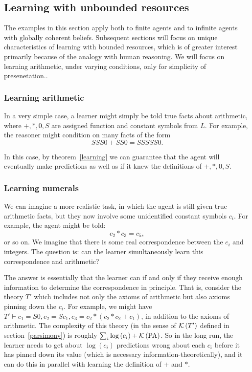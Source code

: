 \documentclass[12pt]{article}
\theoremstyle{definition}
\newcommand{\of}[1]{\left(#1\right)}
\newcommand{\PA}{\text{PA}}
\begin{document}
\subsection{Learning with unbounded resources}

The examples in this section apply both to finite agents
and to infinite agents with globally coherent beliefs.
Subsequent sections will focus on unique characteristics
of learning with bounded resources,
which is of greater interest primarily because of the analogy
with human reasoning.
We will focus on learning arithmetic,
under varying conditions, only for simplicity of presenetation..

\subsubsection{Learning arithmetic}

In a very simple case, a learner might simply be told true facts about arithmetic,
where $+, *, 0, S$ are assigned function and constant symbols
from $L$.
For example, the reasoner might condition on many facts of the form
\[ SSS0 + SS0 = SSSSS0. \]

In this case, by theorem~\ref{learning} we can guarantee
that the agent will eventually make predictions as well as if it
knew the definitions of $+, *, 0, S$.

\subsubsection{Learning numerals}

We can imagine a more realistic task, in which the agent
is still given true arithmetic facts,
but they now involve some unidentified constant symbols $c_i$.
For example, the agent might be told:
\[ c_2 * c_3 = c_5, \]
or so on.
We imagine that there is some real correspondence between the $c_i$
and integers.
The question is: can the learner simultaneously learn this correspondence and arithmetic?

The answer is essentially that the learner can if and only if they receive
enough information to determine the correspondence in principle.
That is, consider the theory $T'$
which includes not only the axioms of arithmetic but also
axioms pinning down the $c_i$.
For example, we might have $T' \vdash c_1 = S 0, c_2 = S c_1, c_3 = c_2 * (c_2 *c_2 + c_1)$,
in addition to the axioms of arithmetic.
The complexity of this theory (in the sense of $\k{T'}$ defined in section~\ref{parsimony})
is roughly $\sum_i \log\of{c_i} + \k{\PA}$.
So in the long run, the learner needs to get about $\log\of{c_i}$
predictions wrong about each $c_i$ before it has pinned down its value
(which is necessary information-theoretically),
and it can do this in parallel with learning the definition of $+$ and $*$.
\end{document}
